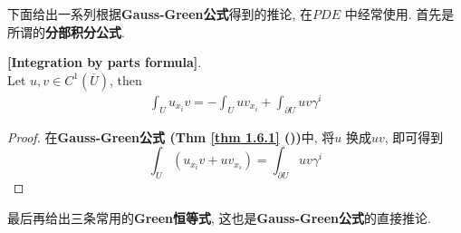 	\vspace{11em}
	
	下面给出一系列根据\textbf{Gauss-Green公式}得到的推论, 在$PDE$ 中经常使用. 首先是所谓的\textbf{分部积分公式}.
	
	\begin{corollary}\label{cor 1.6.2}
		\textbf{[Integration by parts formula]}. \\
		Let $u , v \in C^{1}(\overline{U})$, then
		\begin{align}
			\int_{U} u_{x_i} v = -\int_{U} u v_{x_i} + \int_{\partial U} u v \gamma^i
		\end{align}
	
		\vspace{6em}
		
		\begin{proof}
			在\textbf{Gauss-Green公式 (Thm \ref{thm 1.6.1} ())}中, 将$u$ 换成$uv$, 即可得到
			\[ \int_{U} (u_{x_i}v + u v_{x_i}) = \int_{\partial U} u v \gamma^i \]
		\end{proof}
	\end{corollary}
	
	\newpage
	
	最后再给出三条常用的\textbf{Green恒等式}, 这也是\textbf{Gauss-Green公式}的直接推论.
	
